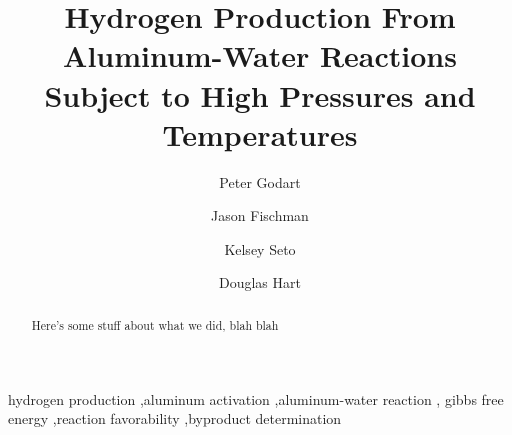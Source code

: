 \documentclass[preprint,12pt,3p]{elsarticle}
\begin{document}
\begin{frontmatter}



\title{Hydrogen Production From Aluminum-Water Reactions Subject to High
  Pressures and Temperatures}


\author{Peter Godart}
\author{Jason Fischman}
\author{Kelsey Seto}
\author{Douglas Hart}

\address{Massachusetts Institute of Technology\\77 Massachusetts Avenue, Rm
  3-252\\Cambridge, MA 02139}

\begin{abstract}
Here's some stuff about what we did, blah blah

\end{abstract}

\begin{keyword}
hydrogen production \sep aluminum activation \sep aluminum-water reaction \sep
gibbs free energy \sep reaction favorability \sep byproduct determination



\end{keyword}

\end{frontmatter}

\end{document}
